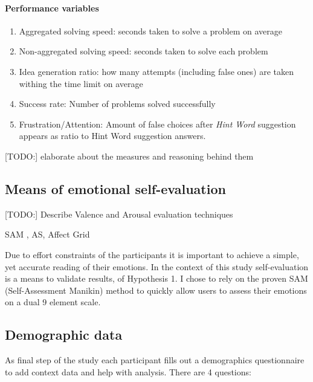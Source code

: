 		\paragraph{Performance variables} \label{sec:creativity-parameters}
		
		\begin{enumerate}
			\item Aggregated solving speed: seconds taken to solve a problem on average
			\item Non-aggregated solving speed: seconds taken to solve each problem
			\item Idea generation ratio: how many attempts (including false ones) are taken withing the time limit on average
			\item Success rate: Number of problems solved successfully
			\item Frustration/Attention: Amount of false choices after \textit{Hint Word} suggestion appears as ratio to Hint Word suggestion answers.
		\end{enumerate}
	
		[TODO:] elaborate about the measures and reasoning behind them


	\subsection{Means of emotional self-evaluation} \label{sec:selfeval}
	
	
	
	[TODO:] Describe Valence and Arousal evaluation techniques
	
	SAM , AS, Affect Grid \cite{Russell1989}
	
	Due to effort constraints of the participants it is important to achieve a simple, yet accurate reading of their emotions. In the context of this study self-evaluation is a means to validate results, of Hypothesis 1. I chose to rely on the proven SAM (Self-Assessment Manikin) method \cite{Bradley1994} to quickly allow users to assess their emotions on a dual 9 element scale.
	
	\subsection{Demographic data} \label{sec:demographics}
	
	As final step of the study each participant fills out a demographics questionnaire to add context data and help with analysis. There are 4 questions:
	
